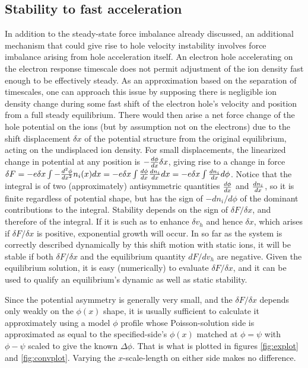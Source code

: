 \documentclass[12pt]{article}
\begin{document}
\subsection{Stability to fast acceleration}

In addition to the steady-state force imbalance already discussed, an
additional mechanism that could give rise to hole velocity instability
involves force imbalance arising from hole acceleration itself. An
electron hole accelerating on the electron response timescale does not
permit adjustment of the ion density fast enough to be effectively
steady. As an approximation based on the separation of timescales, one
can approach this issue by supposing there is negligible ion density
change during some fast shift of the electron hole's velocity and
position from a full steady equilibrium. There would then arise a net
force change of the hole potential on the ions (but by assumption not
on the electrons) due to the shift displacement $\delta x$ of the
potential structure from the original equilibrium, acting on the
undisplaced ion density. For small displacements, the linearized
change in potential at any position is $-{d\phi\over dx} \delta x$,
giving rise to a change in force
$\delta F = - e\delta x \int -{d^2\phi\over dx^2} n_i(x) dx = -e\delta
x \int{d\phi\over dx} {dn_i\over dx} dx=-e\delta x \int {dn_i\over dx}
d\phi$. Notice that the integral is of two (approximately)
antisymmetric quantities ${d\phi\over dx}$ and ${dn_i\over dx}$, so it
is finite regardless of potential shape, but has the sign of
$-dn_i/d\phi$ of the dominant contributions to the integral. Stability
depends on the sign of $\delta F/\delta x$, and therefore of the
integral. If it is such as to enhance $\delta v_h$ and hence
$\delta x$, which arises if $\delta F/\delta x$ is positive,
exponential growth will occur. In so far as the system is correctly
described dynamically by this shift motion with static ions, it will
be stable if both $\delta F/\delta x$ and the equilibrium quantity
$dF/dv_h$ are negative. Given the equilibrium solution, it is easy
(numerically) to evaluate $\delta F/\delta x$, and it can be used to
qualify an equilibrium's dynamic as well as static stability. 

Since the potential asymmetry is generally very small, and the
$\delta F/\delta x$ depends only weakly on the $\phi(x)$ shape, it is
usually sufficient to calculate it approximately using a model $\phi$
profile whose Poisson-solution side is approximated as equal to the
specified-side's $\phi(x)$ matched at $\phi=\psi$ with
$\phi-\psi$ scaled to give the known $\Delta\phi$. That is what is
plotted in figures \ref{fig:explot} and \ref{fig:convplot}. Varying
the $x$-scale-length on either side makes no difference.
\end{document}
